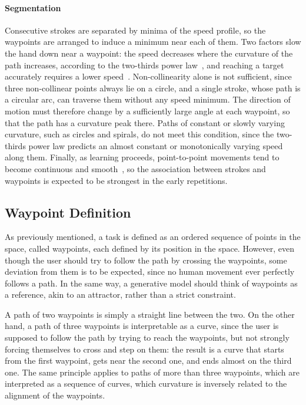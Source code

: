 \documentclass[12pt]{report}
\begin{document}
\paragraph{Segmentation}
Consecutive strokes are separated by minima of the speed profile, so the waypoints are arranged to induce a minimum near each of them. Two factors slow the hand down near a waypoint: the speed decreases where the curvature of the path increases, according to the two-thirds power law~\cite{lacquaniti1983,viviani1995}, and reaching a target accurately requires a lower speed~\cite{fitts1954}. Non-collinearity alone is not sufficient, since three non-collinear points always lie on a circle, and a single stroke, whose path is a circular arc, can traverse them without any speed minimum. The direction of motion must therefore change by a sufficiently large angle at each waypoint, so that the path has a curvature peak there. Paths of constant or slowly varying curvature, such as circles and spirals, do not meet this condition, since the two-thirds power law predicts an almost constant or monotonically varying speed along them. Finally, as learning proceeds, point-to-point movements tend to become continuous and smooth~\cite[pp.~37--38]{senatore2012}, so the association between strokes and waypoints is expected to be strongest in the early repetitions.

\subsection{Waypoint Definition}
As previously mentioned, a task is defined as an ordered sequence of points in the space, called waypoints, each defined by its position in the space. However, even though the user should try to follow the path by crossing the waypoints, some deviation from them is to be expected, since no human movement ever perfectly follows a path. In the same way, a generative model should think of waypoints as a reference, akin to an attractor, rather than a strict constraint.

A path of two waypoints is simply a straight line between the two. On the other hand, a path of three waypoints is interpretable as a curve, since the user is supposed to follow the path by trying to reach the waypoints, but not strongly forcing themselves to cross and step on them: the result is a curve that starts from the first waypoint, gets near the second one, and ends almost on the third one. The same principle applies to paths of more than three waypoints, which are interpreted as a sequence of curves, which curvature is inversely related to the alignment of the waypoints.
\end{document}
